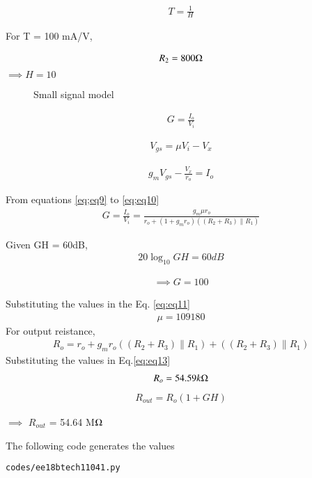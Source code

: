 \begin{enumerate}[label=\thesubsection.\arabic*.,ref=\thesubsection.\theenumi]
\begin{align}
    T = \frac{1}{H}
    \label{eq:eq6}
\end{align}

For T = 100 mA/V,

\begin{align}
    R_2 = 800 \ohm
    \label{eq:eq7}
\end{align}
$\implies H=10$


\begin{figure}[!ht]
	\begin{center}
		\resizebox{\columnwidth}{!}{}
	\end{center}
\caption{Small signal model}
\label{fig:fig2}
\end{figure}


\begin{align}
    G = \frac{I_o}{V_i} 
    \label{eq;eq8}
\end{align}

\begin{align}
    V_{gs} = \mu V_i - V_x
    \label{eq;eq9}
\end{align}

\begin{align}
    g_mV_{gs} - \frac{V_x}{r_o} = I_o
    \label{eq;eq10}
\end{align}

From equations \ref{eq;eq9} to \ref{eq;eq10}
\begin{align}
    G = \frac{I_o}{V_i} = \frac{g_m \mu r_o}{r_o + (1+g_m r_o)((R_2+R_3)\|R_1) }
    \label{eq:eq11}
\end{align}

Given GH = 60dB,
\begin{align}
    20\log_{10} GH = 60 dB
    \label{eq:eq12}
\end{align}

\begin{align}
\implies G=100
\end{align}

Substituting the values in the Eq. \ref{eq:eq11}
\begin{align}
    \mu = 109180
\end{align}
For output reistance,
\begin{align}
    R_o = r_o + g_m r_o((R_2+R_3)\|R_1) + ((R_2+R_3)\|R_1)    
    \label{eq:eq13}
\end{align}
Substituting the values in Eq.\ref{eq:eq13} 
\begin{align}
    R_o=54.59k\ohm
\end{align}
\begin{align}
R_{out} = R_o(1+GH)    
\end{align}

$\implies$  $R_{out}$ = 54.64 M$\ohm$


\begin{table}[!ht]
\centering

\caption{}
\label{table: Output_Table}
\end{table}
    
The following code generates the values
\begin{lstlisting}
codes/ee18btech11041.py
\end{lstlisting}


\end{enumerate}
